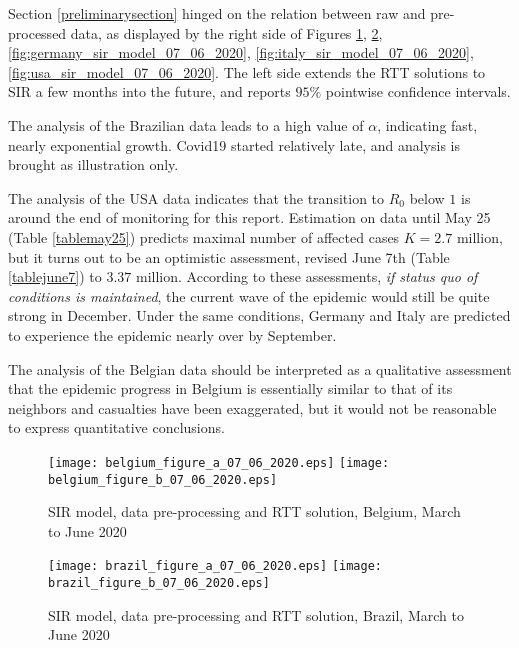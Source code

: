 \documentclass{article}
\begin{document}
Section \ref{preliminarysection} hinged on the relation between raw and pre-processed data, as displayed by the right side of Figures \ref{fig:belgium_sir_model_07_06_2020}, \ref{fig:brazil_sir_model_07_06_2020}, \ref{fig:germany_sir_model_07_06_2020}, \ref{fig:italy_sir_model_07_06_2020}, \ref{fig:usa_sir_model_07_06_2020}. The left side extends the RTT solutions to SIR a few months into the future, and reports $95\%$ pointwise confidence intervals.

The analysis of the Brazilian data leads to a high value of $\alpha$, indicating fast, nearly exponential growth. Covid19 started relatively late, and analysis is brought as illustration only.

The analysis of the USA data indicates that the transition to $R_0$ below $1$ is around the end of monitoring for this report. Estimation on data until May 25 (Table \ref{tablemay25}) predicts maximal number of affected cases $K=2.7$ million, but it turns out to be an optimistic assessment, revised June 7th (Table \ref{tablejune7}) to $3.37$ million. According to these assessments, {\em if status quo of conditions is maintained}, the current wave of the epidemic would still be quite strong in December. Under the same conditions, Germany and Italy are predicted to experience the epidemic nearly over by September.

The analysis of the Belgian data should be interpreted as a qualitative assessment that the epidemic progress in Belgium is essentially similar to that of its neighbors and casualties have been exaggerated, but it would not be reasonable to express quantitative conclusions.

\begin{figure}
\begin{center}
{\texttt{[image: belgium\_figure\_a\_07\_06\_2020.eps]}}
\qquad
{\texttt{[image: belgium\_figure\_b\_07\_06\_2020.eps]}}
\end{center}
\begin{center}
\caption{SIR model, data pre-processing and RTT solution, Belgium, March to June 2020
}
\label{fig:belgium_sir_model_07_06_2020}
\end{center}
\end{figure}

\begin{figure}
\begin{center}
{\texttt{[image: brazil\_figure\_a\_07\_06\_2020.eps]}}
\qquad
{\texttt{[image: brazil\_figure\_b\_07\_06\_2020.eps]}}
\end{center}
\begin{center}
\caption{SIR model, data pre-processing and RTT solution, Brazil, March to June 2020
}
\label{fig:brazil_sir_model_07_06_2020}
\end{center}
\end{figure}
\end{document}
